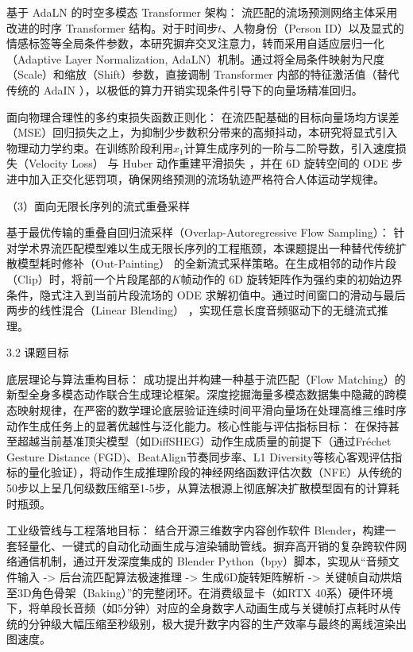 \documentclass[UTF8]{ctexart}
\begin{document}
基于 AdaLN 的时空多模态 Transformer 架构：
流匹配的流场预测网络主体采用改进的时序 Transformer
结构。对于时间步\(t\)、人物身份（Person
ID）以及显式的情感标签等全局条件参数，本研究摒弃交叉注意力，转而采用自适应层归一化（Adaptive
Layer Normalization,
AdaLN）机制。通过将全局条件映射为尺度（Scale）和缩放（Shift）参数，直接调制
Transformer 内部的特征激活值（替代传统的 AdaIN
），以极低的算力开销实现条件引导下的向量场精准回归。

面向物理合理性的多约束损失函数正则化：
在流匹配基础的目标向量场均方误差（MSE）回归损失之上，为抑制少步数积分带来的高频抖动，本研究将显式引入物理动力学约束。在训练阶段利用\({\widehat{x}}_{1}\)计算生成序列的一阶与二阶导数，引入速度损失（Velocity
Loss） 与 Huber 动作重建平滑损失 ，并在 6D 旋转空间的 ODE
步进中加入正交化惩罚项，确保网络预测的流场轨迹严格符合人体运动学规律。

（3）面向无限长序列的流式重叠采样

基于最优传输的重叠自回归流采样（Overlap-Autoregressive Flow Sampling）：
针对学术界流匹配模型难以生成无限长序列的工程瓶颈，本课题提出一种替代传统扩散模型耗时修补（Out-Painting）
的全新流式采样策略。在生成相邻的动作片段（Clip）时，将前一个片段尾部的\(K\)帧动作的
6D 旋转矩阵作为强约束的初始边界条件，隐式注入到当前片段流场的 ODE
求解初值中。通过时间窗口的滑动与最后两步的线性混合（Linear Blending）
，实现任意长度音频驱动下的无缝流式推理。

3.2 课题目标

底层理论与算法重构目标： 成功提出并构建一种基于流匹配（Flow
Matching）的新型全身多模态动作联合生成理论框架。深度挖掘海量多模态数据集中隐藏的跨模态映射规律，在严密的数学理论底层验证连续时间平滑向量场在处理高维三维时序动作生成任务上的显著优越性与泛化能力。核心性能与评估指标目标：
在保持甚至超越当前基准顶尖模型（如DiffSHEG）动作生成质量的前提下（通过Fréchet
Gesture Distance (FGD)、BeatAlign节奏同步率、L1
Diversity等核心客观评估指标的量化验证），将动作生成推理阶段的神经网络函数评估次数（NFE）从传统的50步以上呈几何级数压缩至1-5步，从算法根源上彻底解决扩散模型固有的计算耗时瓶颈。

工业级管线与工程落地目标： 结合开源三维数字内容创作软件
Blender，构建一套轻量化、一键式的自动化动画生成与渲染辅助管线。摒弃高开销的复杂跨软件网络通信机制，通过开发深度集成的
Blender Python（bpy）脚本，实现从``音频文件输入 -\textgreater{}
后台流匹配算法极速推理 -\textgreater{} 生成6D旋转矩阵解析
-\textgreater{}
关键帧自动烘焙至3D角色骨架（Baking）''的完整闭环。在消费级显卡（如RTX
40系）硬件环境下，将单段长音频（如5分钟）对应的全身数字人动画生成与关键帧打点耗时从传统的分钟级大幅压缩至秒级别，极大提升数字内容的生产效率与最终的离线渲染出图速度。
\end{document}
